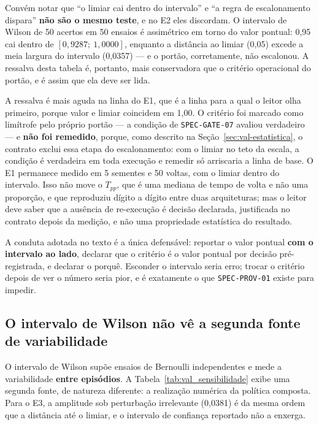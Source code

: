 Convém notar que ``o limiar cai dentro do intervalo'' e ``a regra de
escalonamento dispara'' \textbf{não são o mesmo teste}, e no E2 eles discordam. O
intervalo de Wilson de 50 acertos em 50 ensaios é assimétrico em torno do valor
pontual: 0,95 cai dentro de $[0{,}9287;\ 1{,}0000]$, enquanto a distância ao
limiar (0,05) excede a meia largura do intervalo (0,0357) --- e o portão,
corretamente, não escalonou. A ressalva desta tabela é, portanto, mais
conservadora que o critério operacional do portão, e é assim que ela deve ser
lida.

A ressalva é mais aguda na linha do E1, que é a linha para a qual o leitor olha
primeiro, porque valor e limiar coincidem em 1,00. O critério foi marcado como
limítrofe pelo próprio portão --- a condição de \texttt{SPEC-GATE-07} avaliou
verdadeiro --- e \textbf{não foi remedido}, porque, como descrito na
Seção~\ref{sec:val-estatistica}, o contrato exclui essa etapa do escalonamento:
com o limiar no teto da escala, a condição é verdadeira em toda execução e
remedir só arriscaria a linha de base. O E1 permanece medido em 5 sementes e 50
voltas, com o limiar dentro do intervalo. Isso não move o $T_{pp}$, que é uma
mediana de tempo de volta e não uma proporção, e que reproduziu dígito a dígito
entre duas arquiteturas; mas o leitor deve saber que a ausência de re-execução é
decisão declarada, justificada no contrato depois da medição, e não uma
propriedade estatística do resultado.

A conduta adotada no texto é a única defensável: reportar o valor pontual
\textbf{com o intervalo ao lado}, declarar que o critério é o valor pontual por
decisão pré-registrada, e declarar o porquê. Esconder o intervalo seria erro;
trocar o critério depois de ver o número seria pior, e é exatamente o que
\texttt{SPEC-PROV-01} existe para impedir.

\subsection{O intervalo de Wilson não vê a segunda fonte de variabilidade}

O intervalo de Wilson supõe ensaios de Bernoulli independentes e mede a
variabilidade \textbf{entre episódios}. A Tabela~\ref{tab:val_sensibilidade}
exibe uma segunda fonte, de natureza diferente: a realização numérica da política
composta. Para o E3, a amplitude sob perturbação irrelevante (0,0381) é da mesma
ordem que a distância até o limiar, e o intervalo de confiança reportado não a
enxerga.

